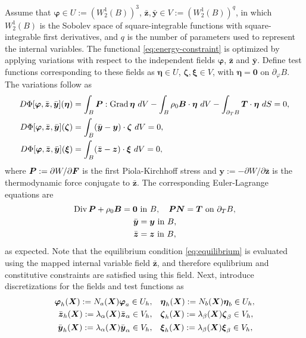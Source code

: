 \documentclass[12pt]{article}
\newcommand{\mbs}[1]{\boldsymbol{#1}}
\def\bP{{\mbs{P}}} \def\bQ{{\mbs{Q}}} \def\bR{{\mbs{R}}}
\def\by{{\mbs{y}}} \def\bz{{\mbs{z}}}
\def\bzeta{{\mbs{\zeta}}}
\def\beeta{{\mbs{\eta}}}
\def\bxi{{\mbs{\xi}}}
\def\bvarphi{{\mbs{\varphi}}}
\DeclareMathOperator{\Div}{Div}
\DeclareMathOperator{\Grad}{Grad}
\begin{document}
Assume that $\bvarphi \in U := (W^1_2(B))^3$, $\bar{\bz}, \bar{\by} \in V :=
(W^1_2(B))^q$, in which $W^1_2(B)$ is the Sobolev space of square-integrable
functions with square-integrable first derivatives, and $q$ is the number of
parameters used to represent the internal variables. The functional
\eqref{eq:energy-constraint} is optimized by applying variations with respect to
the independent fields $\bvarphi$, $\bar{\bz}$ and $\bar{\by}$. Define test
functions corresponding to these fields as $\beeta \in U$, $\bzeta, \bxi \in V$,
with $\beeta = \mathbf{0}$ on $\partial_{\varphi}B$. The variations follow as
\begin{align}\label{eq:variations-phi}
  D\Phi[ \bvarphi, \bar{\bz}, \bar{\by} ](\beeta)
  & =
  \int_B \bP : \Grad \beeta \ dV - \int_B \rho_0 \bB \cdot \beeta \ dV
  -
  \int_{\partial_T B} \bT \cdot \beeta \ dS = 0,
  \\
  D\Phi[ \bvarphi, \bar{\bz}, \bar{\by} ](\bzeta)
  & =
  \int_B (\bar{\by} - \by) \cdot \bzeta \ dV = 0,
  \label{eq:variations-y}
  \\
  D\Phi[ \bvarphi, \bar{\bz}, \bar{\by} ](\bxi)
  & =
  \int_B (\bar{\bz} - \bz) \cdot \bxi \ dV = 0,
  \label{eq:variations-z}
\end{align}
where $\bP := \partial W / \partial \bF$ is the first Piola-Kirchhoff
stress and $\by := - \partial W / \partial \bar{\bz}$ is the
thermodynamic force conjugate to $\bar{\bz}$. The corresponding
Euler-Lagrange equations are
\begin{gather}
  \Div \bP + \rho_0 \bB = \mathbf{0} \text{ in } B, \quad
  \bP \bN = \bT \text{ on } \partial_T B, \label{eq:equilibrium}
  \\
  \bar{\by} = \by \text{ in } B,
  \\
  \bar{\bz} = \bz \text{ in } B,
\end{gather}
as expected. Note that the equilibrium condition \eqref{eq:equilibrium}
is evaluated using the mapped internal variable field $\bar{\bz}$, and
therefore equlibrium and constitutive constraints are satisfied using
this field. Next, introduce discretizations for the fields and test
functions as
\begin{align}
  \bvarphi_h(\bX) := N_a(\bX) \bvarphi_a \in U_h,
  & \quad
  \beeta_h(\bX) := N_b(\bX) \beeta_b \in U_h,
  \\
  \bar{\bz}_h(\bX) := \lambda_\alpha(\bX) \bar{\bz}_\alpha \in V_h,
  & \quad
  \bzeta_h(\bX) := \lambda_\beta(\bX) \bzeta_\beta \in V_h,
  \\
  \bar{\by}_h(\bX) := \lambda_\alpha(\bX) \bar{\by}_\alpha \in V_h,
  & \quad
  \bxi_h(\bX) := \lambda_\beta(\bX) \bxi_\beta \in V_h,
\end{align}
\end{document}
